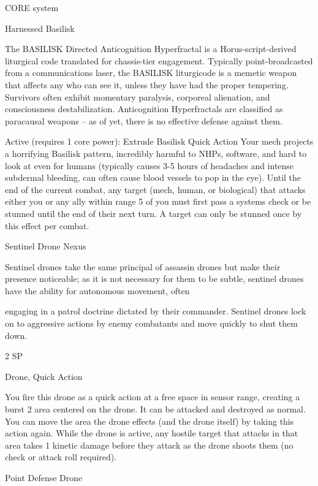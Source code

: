                                                 CORE system

                                             Harnessed Basilisk

 The BASILISK Directed Anticognition Hyperfractal is a Horus-script-derived liturgical code translated for
 chassis-tier engagement. Typically point-broadcasted from a communications laser, the BASILISK
 liturgicode is a memetic weapon that affects any who can see it, unless they have had the proper
 tempering. Survivors often exhibit momentary paralysis, corporeal alienation, and consciousness
 destabilization. Anticognition Hyperfractals are classified as paracausal weapons -- as of yet, there is no
 effective defense against them.

 Active (requires 1 core power):
 Extrude Basilisk
 Quick Action
 Your mech projects a horrifying Basilisk pattern, incredibly harmful to NHPs, software, and hard to look
 at even for humans (typically causes 3-5 hours of headaches and intense subdermal bleeding, can
 often cause blood vessels to pop in the eye). Until the end of the current combat, any target (mech,
 human, or biological) that attacks either you or any ally within range 5 of you must first pass a systems
 check or be stunned until the end of their next turn. A target can only be stunned once by this effect per
 combat.

Sentinel Drone Nexus

Sentinel drones take the same principal of assassin drones but make their presence noticeable; as it is not
necessary for them to be subtle, sentinel drones have the ability for autonomous movement, often




engaging in a patrol doctrine dictated by their commander. Sentinel drones lock on to aggressive actions
by enemy combatants and move quickly to shut them down.

2 SP

Drone, Quick Action

You fire this drone as a quick action at a free space in sensor range, creating a burst 2 area
centered on the drone. It can be attacked and destroyed as normal. You can move the area the
drone effects (and the drone itself) by taking this action again. While the drone is active, any
hostile target that attacks in that area takes 1 kinetic damage before they attack as the drone
shoots them (no check or attack roll required).


Point Defense Drone

